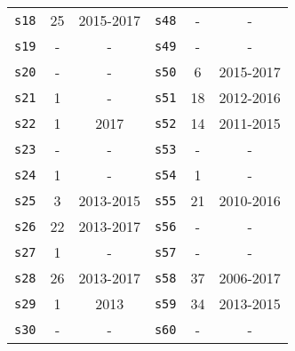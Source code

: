 \begin{longtable}{ l c c | l c c }
      \texttt{s18} & 25 & 2015-2017 &
        \texttt{s48} & - & - \\
      \texttt{s19} & - & - &
        \texttt{s49} & - & - \\
      \texttt{s20} & - & - &
        \texttt{s50} & 6 & 2015-2017 \\
      \texttt{s21} & 1 & - &
        \texttt{s51} & 18 & 2012-2016 \\
      \texttt{s22} & 1 & 2017 &
        \texttt{s52} & 14 & 2011-2015 \\
      \texttt{s23} & - & - &
        \texttt{s53} & - & - \\
      \texttt{s24} & 1 & - &
        \texttt{s54} & 1 & - \\
      \texttt{s25} & 3 & 2013-2015 &
        \texttt{s55} & 21 & 2010-2016 \\
      \texttt{s26} & 22 & 2013-2017 &
        \texttt{s56} & - & - \\
      \texttt{s27} & 1 & - &
        \texttt{s57} & - & - \\
      \texttt{s28} & 26 & 2013-2017 &
        \texttt{s58} & 37 & 2006-2017 \\
      \texttt{s29} & 1 & 2013 &
        \texttt{s59} & 34 & 2013-2015 \\
      \texttt{s30} & - & - &
        \texttt{s60} & - & - \\
\end{longtable}
